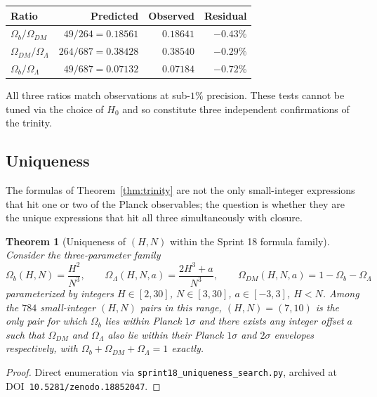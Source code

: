 \documentclass[11pt,reqno]{amsart}
\theoremstyle{plain}
\newtheorem{theorem}{Theorem}[section]
\theoremstyle{definition}
\theoremstyle{remark}
\begin{document}
\begin{table}[h]
\centering
\begin{tabular}{lrrr}
\toprule
Ratio & Predicted & Observed & Residual \\
\midrule
$\Omega_b / \Omega_{DM}$        & $49/264 = 0.18561$  & $0.18641$ & $-0.43\%$ \\
$\Omega_{DM} / \Omega_\Lambda$  & $264/687 = 0.38428$ & $0.38540$ & $-0.29\%$ \\
$\Omega_b / \Omega_\Lambda$     & $49/687 = 0.07132$  & $0.07184$ & $-0.72\%$ \\
\bottomrule
\end{tabular}
\end{table}

All three ratios match observations at sub-$1\%$ precision. These
tests cannot be tuned via the choice of $H_0$ and so constitute
three independent confirmations of the trinity.

\subsection{Uniqueness}\label{sec:uniqueness}

The formulas of Theorem~\ref{thm:trinity} are not the only
small-integer expressions that hit one or two of the Planck
observables; the question is whether they are the unique
expressions that hit all three simultaneously with closure.

\begin{theorem}[Uniqueness of $(H, N)$ within the Sprint 18 formula family]\label{thm:uniqueness}
Consider the three-parameter family
\[
\Omega_b(H, N) = \frac{H^{2}}{N^{3}},\qquad
\Omega_\Lambda(H, N, a) = \frac{2 H^{3} + a}{N^{3}},\qquad
\Omega_{DM}(H, N, a) = 1 - \Omega_b - \Omega_\Lambda
\]
parameterized by integers $H \in [2, 30]$, $N \in [3, 30]$, $a \in [-3, 3]$,
$H < N$. Among the $784$ small-integer $(H, N)$ pairs in this range,
$(H, N) = (7, 10)$ is the \emph{only} pair for which $\Omega_b$ lies
within Planck $1\sigma$ and there exists any integer offset $a$
such that $\Omega_{DM}$ and $\Omega_\Lambda$ also lie within their
Planck $1\sigma$ and $2\sigma$ envelopes respectively, with
$\Omega_b + \Omega_{DM} + \Omega_\Lambda = 1$ exactly.
\end{theorem}

\begin{proof}
Direct enumeration via \texttt{sprint18\_uniqueness\_search.py},
archived at DOI~\texttt{10.5281/zenodo.18852047}.
\end{proof}
\end{document}
